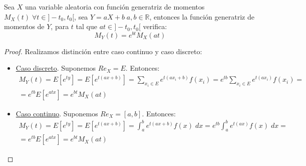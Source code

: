 \begin{prop}
    Sea $X$ una variable aleatoria con función generatriz de momentos $M_X(t)\;\forall t \in ]-t_0, t_0[$, sea $Y = aX +b\;a, b \in \mathbb{R}$, entonces la función generatriz de momentos de $Y$, para $t$ tal que $at \in ]-t_0, t_0[$ verifica:
    \begin{equation*}
        M_Y(t) = e^{bt}M_X(at)
    \end{equation*}
\end{prop}
\begin{proof}
    Realizamos distinción entre caso continuo y caso discreto:
    \begin{itemize}
        \item \underline{Caso discreto}. Suponemos $Re_X = E$. Entonces:
        \begin{multline*}
            M_Y(t) = E[e^{ty}] = E[e^{t(ax+b)}] = \sum_{x_i\in E} e^{t(ax_i+b)}f(x_i)
            = e^{tb}\sum_{x_i\in E} e^{t(ax_i)}f(x_i)
            =\\= e^{tb}E[e^{atx}] = e^{bt}M_X(at)
        \end{multline*}

        \item \underline{Caso continuo}. Suponemos $Re_X = [a,b]$. Entonces:
        \begin{multline*}
            M_Y(t) = E[e^{ty}] = E[e^{t(ax+b)}] = \int_a^b e^{t(ax+b)}f(x)\;dx
            = e^{tb}\int_a^b e^{t(ax)}f(x)\;dx
            =\\= e^{tb}E[e^{atx}] = e^{bt}M_X(at)
        \end{multline*}
    \end{itemize}
\end{proof}